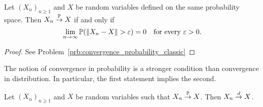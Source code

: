 \begin{lemma}\label{lem:convergence_probability_classical}
Let $(X_n)_{n \ge 1}$ and $X$ be random variables defined on the same probability space. Then $X_n \stackrel{\mathbb P}{\rightarrow} X$ if and only if
\[
	\lim_{n \to \infty} \mathbb P(\|X_n - X\| > \varepsilon) = 0 \quad \text{for every } \varepsilon > 0.
\]
\end{lemma}

\begin{proof}
See Problem~\ref{prb:convergence_probability_classic}
\end{proof}


The notion of convergence in probability is a stronger condition than convergence in distribution. In particular, the first statement implies the second. 

\begin{lemma}
Let $(X_n)_{n \ge 1}$ and $X$ be random variables such that $X_n \stackrel{\mathbb P}{\rightarrow} X$. Then $X_n \stackrel{d}{\rightarrow} X$.
\end{lemma}

